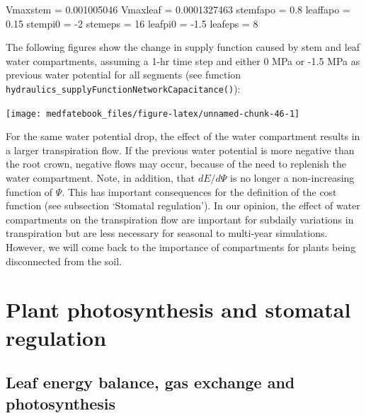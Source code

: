 \documentclass[]{book}
\newenvironment{Shaded}{\begin{snugshade}}{\end{snugshade}}
\newcommand{\DecValTok}[1]{\textcolor[rgb]{0.00,0.00,0.81}{#1}}
\newcommand{\FloatTok}[1]{\textcolor[rgb]{0.00,0.00,0.81}{#1}}
\newcommand{\StringTok}[1]{\textcolor[rgb]{0.31,0.60,0.02}{#1}}
\newcommand{\NormalTok}[1]{#1}
\begin{document}
\begin{Shaded}
\begin{Highlighting}[]
\NormalTok{Vmaxstem =}\StringTok{ }\FloatTok{0.001005046}
\NormalTok{Vmaxleaf =}\StringTok{ }\FloatTok{0.0001327463}
\NormalTok{stemfapo =}\StringTok{ }\FloatTok{0.8}
\NormalTok{leaffapo =}\StringTok{ }\FloatTok{0.15}
\NormalTok{stempi0 =}\StringTok{ }\DecValTok{-2}
\NormalTok{stemeps =}\StringTok{ }\DecValTok{16}
\NormalTok{leafpi0 =}\StringTok{ }\FloatTok{-1.5}
\NormalTok{leafeps =}\StringTok{ }\DecValTok{8}
\end{Highlighting}
\end{Shaded}

The following figures show the change in supply function caused by stem and leaf water compartments, assuming a 1-hr time step and either 0 MPa or -1.5 MPa as previous water potential for all segments (see function \texttt{hydraulics\_supplyFunctionNetworkCapacitance()}):

\begin{center}\texttt{[image: medfatebook\_files/figure-latex/unnamed-chunk-46-1]} \end{center}

For the same water potential drop, the effect of the water compartment results in a larger transpiration flow. If the previous water potential is more negative than the root crown, negative flows may occur, because of the need to replenish the water compartment. Note, in addition, that \(dE/d\Psi\) is no longer a non-increasing function of \(\Psi\). This has important consequences for the definition of the cost function (see subsection `Stomatal regulation'). In our opinion, the effect of water compartments on the transpiration flow are important for subdaily variations in transpiration but are less necessary for seasonal to multi-year simulations. However, we will come back to the importance of compartments for plants being disconnected from the soil.

\hypertarget{plant-photosynthesis-and-stomatal-regulation}{%
\chapter{Plant photosynthesis and stomatal regulation}\label{plant-photosynthesis-and-stomatal-regulation}}

\hypertarget{leaf-energy-balance-gas-exchange-and-photosynthesis}{%
\section{Leaf energy balance, gas exchange and photosynthesis}\label{leaf-energy-balance-gas-exchange-and-photosynthesis}}
\end{document}
